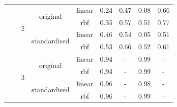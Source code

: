 \documentclass{mpaper}
\begin{document}
\begin{table}[]
\begin{tabular}{|cccc|ccccc|}
\multicolumn{1}{|c|}{}                                  & \multicolumn{1}{c|}{}                                    & \multicolumn{1}{c|}{\multirow{4}{*}{2}}                   & \multirow{2}{*}{original}                    & \multicolumn{1}{c|}{linear}          & 0.24          & 0.47         & 0.08         & 0.66         \\
\multicolumn{1}{|c|}{}                                  & \multicolumn{1}{c|}{}                                    & \multicolumn{1}{c|}{}                                     &                                              & \multicolumn{1}{c|}{rbf}             & 0.35          & 0.57         & 0.51         & 0.77         \\ \cline{4-9} 
\multicolumn{1}{|c|}{}                                  & \multicolumn{1}{c|}{}                                    & \multicolumn{1}{c|}{}                                     & \multirow{2}{*}{standardised}                & \multicolumn{1}{c|}{linear}          & 0.46          & 0.54         & 0.05         & 0.51         \\
\multicolumn{1}{|c|}{}                                  & \multicolumn{1}{c|}{}                                    & \multicolumn{1}{c|}{}                                     &                                              & \multicolumn{1}{c|}{rbf}             & 0.53          & 0.66         & 0.52         & 0.61         \\ \cline{3-9} 
\multicolumn{1}{|c|}{}                                  & \multicolumn{1}{c|}{}                                    & \multicolumn{1}{c|}{\multirow{4}{*}{3}}                   & \multirow{2}{*}{original}                    & \multicolumn{1}{c|}{linear}          & 0.94          & -            & 0.99         & -            \\
\multicolumn{1}{|c|}{}                                  & \multicolumn{1}{c|}{}                                    & \multicolumn{1}{c|}{}                                     &                                              & \multicolumn{1}{c|}{rbf}             & 0.94          & -            & 0.99         & -            \\ \cline{4-9} 
\multicolumn{1}{|c|}{}                                  & \multicolumn{1}{c|}{}                                    & \multicolumn{1}{c|}{}                                     & \multirow{2}{*}{standardised}                & \multicolumn{1}{c|}{linear}          & 0.96          & -            & 0.98         & -            \\
\multicolumn{1}{|c|}{}                                  & \multicolumn{1}{c|}{}                                    & \multicolumn{1}{c|}{}                                     &                                              & \multicolumn{1}{c|}{rbf}             & 0.96          & -            & 0.99         & -            \\ \hline

\end{tabular}
\end{table}
\end{document}
